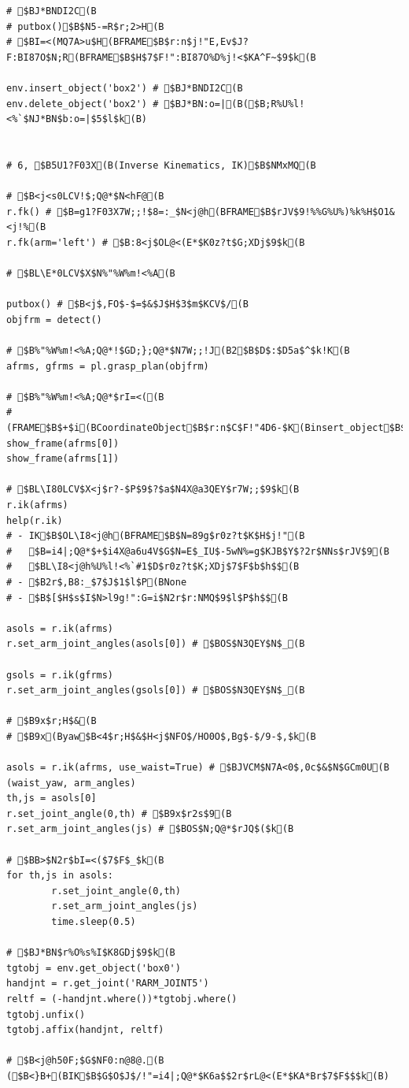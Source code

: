 \documentclass[11pt]{jarticle}
\begin{document}
{{{\begin{verbatim}
# $BJ*BNDI2C(B
# putbox()$B$N5-=R$r;2>H(B
# $BI=<(MQ7A>u$H(BFRAME$B$r:n$j!"E,Ev$J?F:BI87O$N;R(BFRAME$B$H$7$F!":BI87O%D%j!<$KA^F~$9$k(B

env.insert_object('box2') # $BJ*BNDI2C(B
env.delete_object('box2') # $BJ*BN:o=|(B($B;R%U%l!<%`$NJ*BN$b:o=|$5$l$k(B)


# 6, $B5U1?F03X(B(Inverse Kinematics, IK)$B$NMxMQ(B

# $B<j<s0LCV!$;Q@*$N<hF@(B
r.fk() # $B=g1?F03X7W;;!$8=:_$N<j@h(BFRAME$B$rJV$9!%%G%U%)%k%H$O1&<j!%(B
r.fk(arm='left') # $B:8<j$OL@<(E*$K0z?t$G;XDj$9$k(B

# $BL\E*0LCV$X$N%"%W%m!<%A(B

putbox() # $B<j$,FO$-$=$&$J$H$3$m$KCV$/(B
objfrm = detect()

# $B%"%W%m!<%A;Q@*!$GD;};Q@*$N7W;;!J(B2$B$D$:$D5a$^$k!K(B
afrms, gfrms = pl.grasp_plan(objfrm)

# $B%"%W%m!<%A;Q@*$rI=<((B
# (FRAME$B$+$i(BCoordinateObject$B$r:n$C$F!"4D6-$K(Binsert_object$B$9$k(B)
show_frame(afrms[0])
show_frame(afrms[1])

# $BL\I80LCV$X<j$r?-$P$9$?$a$N4X@a3QEY$r7W;;$9$k(B
r.ik(afrms)
help(r.ik)
# - IK$B$OL\I8<j@h(BFRAME$B$N=89g$r0z?t$K$H$j!"(B
#   $B=i4|;Q@*$+$i4X@a6u4V$G$N=E$_IU$-5wN%=g$KJB$Y$?2r$NNs$rJV$9(B
#   $BL\I8<j@h%U%l!<%`#1$D$r0z?t$K;XDj$7$F$b$h$$(B
# - $B2r$,B8:_$7$J$1$l$P(BNone
# - $B$[$H$s$I$N>l9g!":G=i$N2r$r:NMQ$9$l$P$h$$(B

asols = r.ik(afrms)
r.set_arm_joint_angles(asols[0]) # $BOS$N3QEY$N$_(B

gsols = r.ik(gfrms)
r.set_arm_joint_angles(gsols[0]) # $BOS$N3QEY$N$_(B

# $B9x$r;H$&(B
# $B9x(Byaw$B<4$r;H$&$H<j$NFO$/HO0O$,Bg$-$/9-$,$k(B

asols = r.ik(afrms, use_waist=True) # $BJVCM$N7A<0$,0c$&$N$GCm0U(B (waist_yaw, arm_angles)
th,js = asols[0]
r.set_joint_angle(0,th) # $B9x$r2s$9(B
r.set_arm_joint_angles(js) # $BOS$N;Q@*$rJQ$($k(B

# $BB>$N2r$bI=<($7$F$_$k(B
for th,js in asols:
        r.set_joint_angle(0,th)
        r.set_arm_joint_angles(js)
        time.sleep(0.5)

# $BJ*BN$r%O%s%I$K8GDj$9$k(B
tgtobj = env.get_object('box0')
handjnt = r.get_joint('RARM_JOINT5')
reltf = (-handjnt.where())*tgtobj.where()
tgtobj.unfix()
tgtobj.affix(handjnt, reltf)

# $B<j@h50F;$G$NF0:n@8@.(B ($B<}B+(BIK$B$G$O$J$/!"=i4|;Q@*$K6a$$2r$rL@<(E*$KA*Br$7$F$$$k(B)


\end{verbatim}}}}
\end{document}
